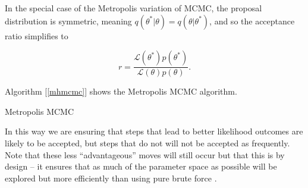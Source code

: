     In the special case of the Metropolis variation of MCMC, the proposal distribution is symmetric, meaning $q(\theta^*|\theta) = q(\theta|\theta^*)$, and so the acceptance ratio simplifies to

    \begin{equation}
    	r = \frac{\mathcal{L}(\theta^*)p(\theta^*)}{\mathcal{L}(\theta)p(\theta)}.
    \end{equation}

    Algorithm [\ref{mhmcmc}] shows the Metropolis MCMC algorithm.
    
    \begin{algorithm}

        \BlankLine

        \DontPrintSemicolon


        \BlankLine


        \BlankLine


        \BlankLine

        \caption{Metropolis MCMC \label{mhmcmc}}

    \end{algorithm}
    

    In this way we are ensuring that steps that lead to better likelihood outcomes are likely to be accepted, but steps that do not will not be accepted as frequently. Note that these less ``advantageous'' moves will still occur but that this is by design -- it ensures that as much of the parameter space as possible will be explored but more efficiently than using pure brute force \cite{Andrieu2003}.



